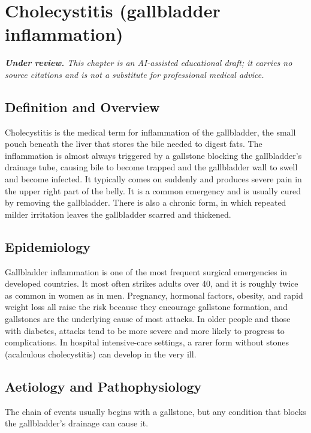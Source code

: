 \chapter{Cholecystitis (gallbladder inflammation)}

\medskip
\noindent\textit{\textbf{Under review.} This chapter is an AI-assisted educational draft; it carries no source citations and is not a substitute for professional medical advice.}

\section*{Definition and Overview}
Cholecystitis is the medical term for inflammation of the gallbladder, the small pouch beneath the liver that stores the bile needed to digest fats. The inflammation is almost always triggered by a gallstone blocking the gallbladder's drainage tube, causing bile to become trapped and the gallbladder wall to swell and become infected. It typically comes on suddenly and produces severe pain in the upper right part of the belly. It is a common emergency and is usually cured by removing the gallbladder. There is also a chronic form, in which repeated milder irritation leaves the gallbladder scarred and thickened.

\section*{Epidemiology}
Gallbladder inflammation is one of the most frequent surgical emergencies in developed countries. It most often strikes adults over 40, and it is roughly twice as common in women as in men. Pregnancy, hormonal factors, obesity, and rapid weight loss all raise the risk because they encourage gallstone formation, and gallstones are the underlying cause of most attacks. In older people and those with diabetes, attacks tend to be more severe and more likely to progress to complications. In hospital intensive-care settings, a rarer form without stones (acalculous cholecystitis) can develop in the very ill.

\section*{Aetiology and Pathophysiology}
The chain of events usually begins with a gallstone, but any condition that blocks the gallbladder's drainage can cause it.

